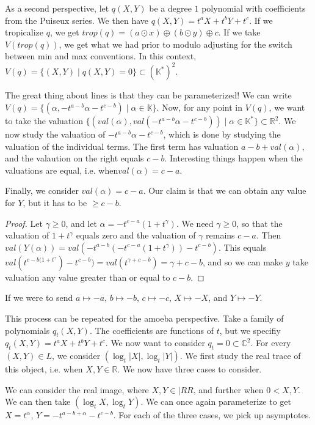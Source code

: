 \documentclass[12pt]{memoir}
\theoremstyle{definition}
\def\RR{{\mathbb R}}
\def\KK{{\mathbb K}}
\def\CC{{\mathbb C}}
\begin{document}
As a second perspective, let $q(X,Y)$ be a degree $1$ polynomial with coefficients from the Puiseux series. We then have $q(X,Y)=t^aX+t^bY+t^c$. If we tropicalize $q$, we get $trop(q)=(a \odot x) \oplus (b \odot y) \oplus c$. If we take $V(trop (q))$, we get what we had prior to modulo adjusting for the switch between min and max conventions. In this context, $V(q) = \{(X,Y)\; |\; q(X,Y)=0\} \subset (\KK^*)^2.$


The great thing about lines is that they can be parameterized! We can write $V(q)= \{(\alpha, -t^{a-b}\alpha -t^{c-b})\; |\; \alpha \in \KK\}$. Now, for any point in $V(q)$, we want to take the valuation $\{(val(\alpha),val( -t^{a-b}\alpha -t^{c-b}))\; |\; \alpha \in \KK^*\} \subset \RR^2$. We now study the valuation of $-t^{a-b}\alpha -t^{c-b}$, which is done by studying the valuation of the individual terms. The first term has valuation $a-b + val(\alpha)$, and the valaution on the right equals $c-b$. Interesting things happen when the valuations are equal, i.e. when$ val(\alpha)= c-a$.


Finally, we consider $val(\alpha) = c-a$. Our claim is that we can obtain any value for $Y$, but it has to be $\geq c-b$. 

\begin{proof}
    Let $\gamma \geq 0$, and let $\alpha =-t^{c-a}(1+t^\gamma)$. We need $\gamma \geq 0$, so that the valuation of $1+t^{\gamma}$ equals zero and the valuation of $\gamma$ remains $c-a$. Then $val(Y(\alpha)) =val(-t^{a-b}(-t^{c-a}(1+t^\gamma)) - t^{c-b} )$. This equals $val(t^{c-b(1+t^\gamma}) -t^{c-b}) = val(t^{\gamma +c-b}) = \gamma+c-b$, and so we can make $y$ take valuation any value greater than or equal to $c-b$.
\end{proof}


If we were to send $a \mapsto -a$, $b \mapsto -b$, $c \mapsto -c$, $X \mapsto -X$, and $Y \mapsto -Y$.


This process can be repeated for the amoeba perspective. Take a family of polynomials $q_t(X,Y)$. The coefficients are functions of $t$, but we specifiy $q_t(X,Y) = t^aX + t^bY+t^c$. We now want to consider $q_t = 0 \subset \CC^2$. For every $(X,Y) \in L$, we consider $(\log_t|X|,\log_t|Y|)$. We first study the real trace of this object, i.e. when $ X,Y \in \RR$. We now have three cases to consider. 


We can consider the real image, where $X,Y \in |RR$, and further when $0< X,Y$. We can then take $(\log_tX,\log_tY)$. We can once again parameterize to get $X= t^\alpha$, $Y = -t^{a-b+\alpha} -t^{c-b}$.  For each of the three cases, we pick up asymptotes.
\end{document}
